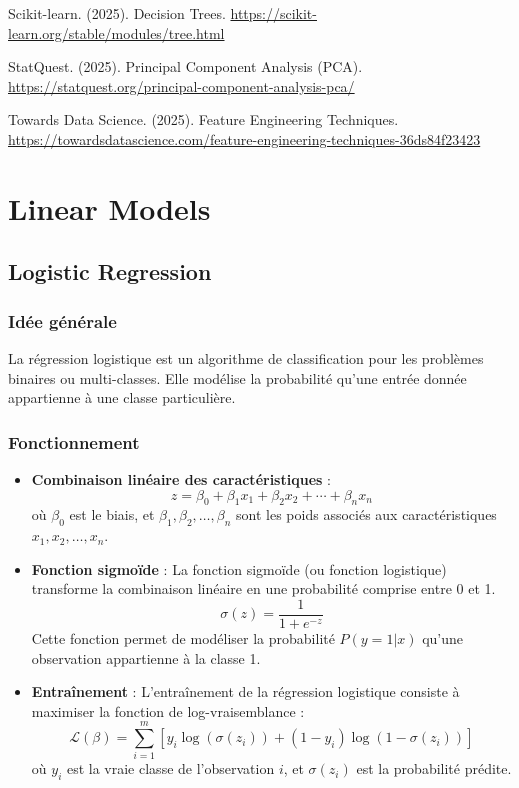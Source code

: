 \documentclass[10pt,a4paper]{article}
\begin{document}

\begin{thebibliography}{9}
Scikit-learn. (2025). Decision Trees.
\url{https://scikit-learn.org/stable/modules/tree.html}

StatQuest. (2025). Principal Component Analysis (PCA).
\url{https://statquest.org/principal-component-analysis-pca/}

Towards Data Science. (2025). Feature Engineering Techniques.
\url{https://towardsdatascience.com/feature-engineering-techniques-36ds84f23423}
\end{thebibliography}

\section*{Linear Models}

\subsection*{Logistic Regression}

\subsubsection*{Idée générale}

La régression logistique est un algorithme de classification pour les problèmes binaires ou multi-classes. Elle modélise la probabilité qu'une entrée donnée appartienne à une classe particulière.

\subsubsection*{Fonctionnement}

\begin{itemize}
    \item \textbf{Combinaison linéaire des caractéristiques} :
    \[
    z = \beta_0 + \beta_1 x_1 + \beta_2 x_2 + \cdots + \beta_n x_n
    \]
    où \( \beta_0 \) est le biais, et \( \beta_1, \beta_2, \ldots, \beta_n \) sont les poids associés aux caractéristiques \( x_1, x_2, \ldots, x_n \).

    \item \textbf{Fonction sigmoïde} :
    La fonction sigmoïde (ou fonction logistique) transforme la combinaison linéaire en une probabilité comprise entre 0 et 1.
    \[
    \sigma(z) = \frac{1}{1 + e^{-z}}
    \]
    Cette fonction permet de modéliser la probabilité \( P(y = 1|x) \) qu'une observation appartienne à la classe 1.

    \item \textbf{Entraînement} :
    L'entraînement de la régression logistique consiste à maximiser la fonction de log-vraisemblance :
    \[
    \mathcal{L}(\beta) = \sum_{i=1}^{m} [y_i \log(\sigma(z_i)) + (1 - y_i) \log(1 - \sigma(z_i))]
    \]
    où \( y_i \) est la vraie classe de l'observation \( i \), et \( \sigma(z_i) \) est la probabilité prédite.
\end{itemize}
\end{document}
